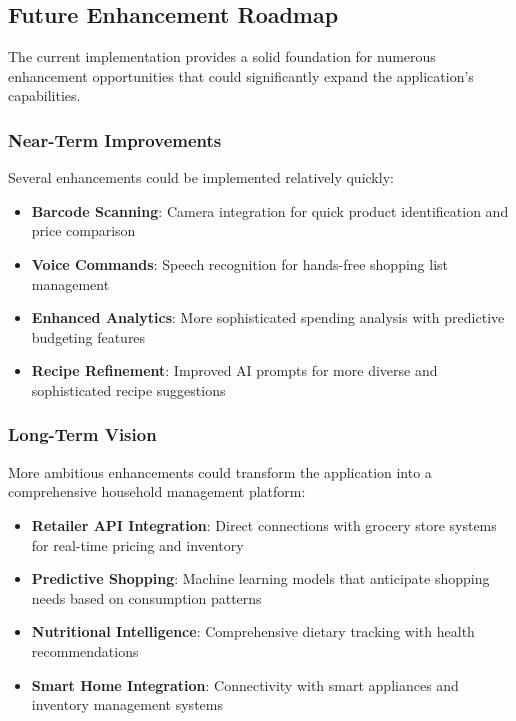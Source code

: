\documentclass[11pt,a4paper]{article}
\begin{document}
\subsection{Future Enhancement Roadmap}

The current implementation provides a solid foundation for numerous enhancement opportunities that could significantly expand the application's capabilities.

\subsubsection{Near-Term Improvements}

Several enhancements could be implemented relatively quickly:

\begin{itemize}
    \item \textbf{Barcode Scanning}: Camera integration for quick product identification and price comparison
    \item \textbf{Voice Commands}: Speech recognition for hands-free shopping list management
    \item \textbf{Enhanced Analytics}: More sophisticated spending analysis with predictive budgeting features
    \item \textbf{Recipe Refinement}: Improved AI prompts for more diverse and sophisticated recipe suggestions
\end{itemize}

\subsubsection{Long-Term Vision}

More ambitious enhancements could transform the application into a comprehensive household management platform:

\begin{itemize}
    \item \textbf{Retailer API Integration}: Direct connections with grocery store systems for real-time pricing and inventory
    \item \textbf{Predictive Shopping}: Machine learning models that anticipate shopping needs based on consumption patterns
    \item \textbf{Nutritional Intelligence}: Comprehensive dietary tracking with health recommendations
    \item \textbf{Smart Home Integration}: Connectivity with smart appliances and inventory management systems
\end{itemize}
\end{document}
